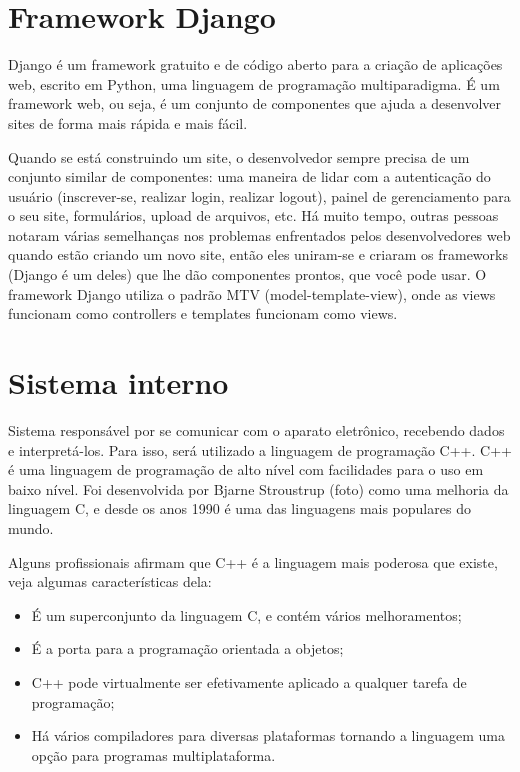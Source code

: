 \section{Framework Django}

Django é um framework gratuito e de código aberto para a criação de aplicações web, escrito em Python, uma linguagem de programação multiparadigma. É um framework web, ou seja, é um conjunto de componentes que ajuda a desenvolver sites de forma mais rápida e mais fácil.

Quando se está construindo um site, o desenvolvedor sempre precisa de um conjunto similar de componentes: uma maneira de lidar com a autenticação do usuário (inscrever-se, realizar login, realizar logout), painel de gerenciamento para o seu site, formulários, upload de arquivos, etc. Há muito tempo, outras pessoas notaram várias semelhanças nos problemas enfrentados pelos desenvolvedores web quando estão criando um novo site, então eles uniram-se e criaram os frameworks (Django é um deles) que lhe dão componentes prontos, que você pode usar. O framework Django utiliza o padrão MTV (model-template-view), onde as views funcionam como controllers e templates funcionam como views. 

\section{Sistema interno}

Sistema responsável por se comunicar com o aparato eletrônico, recebendo dados e interpretá-los. Para isso, será utilizado a linguagem de programação C++. C++ é uma linguagem de programação de alto nível com facilidades para o uso em baixo nível. Foi desenvolvida por Bjarne Stroustrup (foto) como uma melhoria da linguagem C, e desde os anos 1990 é uma das linguagens mais populares do mundo.

Alguns profissionais afirmam que C++ é a linguagem mais poderosa que existe, veja algumas características dela:

\begin{itemize}
\item É um superconjunto da linguagem C, e contém vários melhoramentos;
\item É a porta para a programação orientada a objetos;
\item C++ pode virtualmente ser efetivamente aplicado a qualquer tarefa de programação;
\item Há vários compiladores para diversas plataformas tornando a linguagem uma opção para programas multiplataforma.
\end{itemize}

